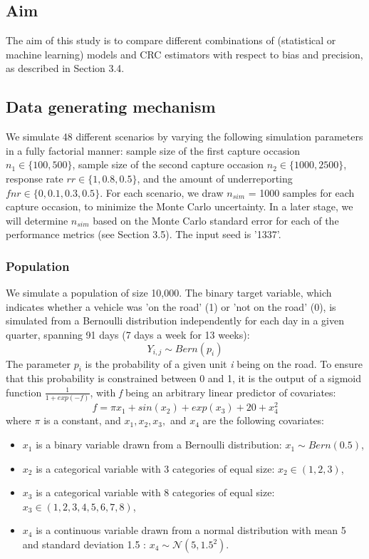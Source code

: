 \documentclass[12pt, a4paper]{article}
\begin{document}
\subsection{Aim}
\noindent The aim of this study is to compare different combinations of (statistical or machine learning) models and CRC estimators with respect to bias and precision, as described in Section 3.4. 

\subsection{Data generating mechanism}
\noindent We simulate 48 different scenarios by varying the following simulation parameters in a fully factorial manner: sample size of the first capture occasion $n_1 \in \{100, 500\}$, sample size of the second capture occasion $n_2 \in \{1000, 2500\}$, response rate $rr \in \{1, 0.8, 0.5\}$, and the amount of underreporting $ fnr\in \{0, 0.1, 0.3, 0.5\}$. For each scenario, we draw $n_{sim}$ = 1000 samples for each capture occasion, to minimize the Monte Carlo uncertainty. In a later stage, we will determine $n_{sim}$ based on the Monte Carlo standard error for each of the performance metrics (see Section 3.5). The input seed is '1337'. 

\subsubsection*{Population}
\noindent We simulate a population of size 10,000. The binary target variable, which indicates whether a vehicle was 'on the road' (1) or 'not on the road' (0), is simulated from a Bernoulli distribution independently for each day in a given quarter, spanning 91 days (7 days a week for 13 weeks):
$$ Y_{i,j} \sim Bern(p_i)$$
The parameter $p_i$ is the probability of a given unit \textit{i} being on the road. To ensure that this probability is constrained between 0 and 1, it is the output of a sigmoid function $\frac{1}{1+exp(-f)}$, with \textit{f} being an arbitrary linear predictor of covariates:
$$f = \pi x_1 + sin(x_2) + exp(x_3) + 20 + x_4^2$$
where $\pi$ is a constant, and $x_1, x_2, x_3,$ and $x_4$ are the following covariates:
\begin{itemize}
    \item $x_1$ is a binary variable drawn from a Bernoulli distribution: $x_1 \sim Bern(0.5)$,
    \item $x_2$ is a categorical variable with 3 categories of equal size: $x_2 \in (1, 2, 3)$,
    \item $x_3$ is a categorical variable with 8 categories of equal size: $x_3 \in (1, 2, 3, 4, 5, 6, 7, 8)$,
    \item $x_4$ is a continuous variable drawn from a normal distribution with mean 5 and standard deviation 1.5 : $x_4 \sim \mathcal{N}(5, 1.5^2)$.
\end{itemize}
\end{document}
